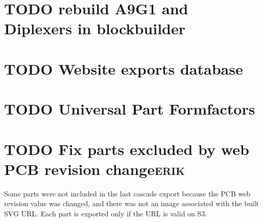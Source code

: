 \documentclass[11pt]{article}
\begin{document}
\section{{\bfseries\sffamily TODO}  rebuild A9G1 and Diplexers in blockbuilder}
\label{sec:org7a55b5f}
\section{{\bfseries\sffamily TODO}  Website exports database}
\label{sec:org86e792c}

\section{{\bfseries\sffamily TODO}  Universal Part Formfactors}
\label{sec:orgeab477a}
\section{{\bfseries\sffamily TODO}  Fix parts excluded by web PCB revision change\hfill{}\textsc{erik}}
\label{sec:org6759a9f}
Some parts were not included in the last cascade export because the PCB web revision value was changed, and there was not an image associated with the built SVG URL. Each part is exported only if the URL is valid on S3.
\end{document}
